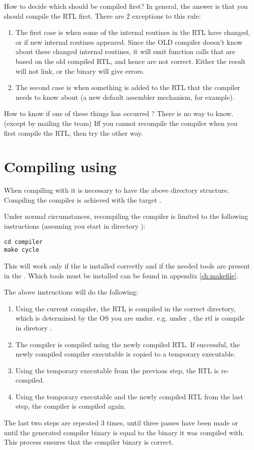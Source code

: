 \documentclass{report}
\begin{document}
How to decide which should be compiled first? In general, the answer is that
you should compile the RTL first. There are 2 exceptions to this rule:
\begin{enumerate}
\item The first case is when some of the internal routines in the RTL 
have changed, or if new internal routines appeared. Since the OLD compiler
doesn't know about these changed internal routines, it will emit function
calls that are based on the old compiled RTL, and hence are not correct.
Either the result will not link, or the binary will give errors.
\item The second case is when something is added to the RTL that the
compiler needs to know about (a new default assembler mechanism, for
example).
\end{enumerate}
How to know if one of these things has occurred ? There is no way to know.
(except by mailing the \fpc team) Iff you cannot recompile the compiler 
when you first compile the RTL, then try the other way.

\section{Compiling using }

When compiling with  it is necessary to have the above directory
structure. Compiling the compiler is achieved with the target .

Under normal circumstances, recompiling the compiler is limited to the
following instructions (assuming you start in directory ):
\begin{verbatim}
cd compiler
make cycle
\end{verbatim}
This will work only if the  is installed correctly and
if the needed tools are present in the . Which tools must be
installed can be found in appendix \ref{ch:makefile}.

The above instructions will do the following:
\begin{enumerate}
\item Using the current compiler, the RTL is compiled in the correct
directory, which is determined by the OS you are under. e.g. under \linux,
the rtl is compile in diretory .
\item The compiler is compiled using the newly compiled RTL. If successful,
the newly compiled compiler executable is copied to a temporary executable.
\item Using the temporary executable from the previous step, the RTL is
re-compiled.
\item Using the temporary executable and the newly compiled RTL from the
last step, the compiler is compiled again.
\end{enumerate}
The last two steps are repeated 3 times, until three passes have been made or
until the generated compiler binary is equal to the binary it was compiled
with. This process ensures that the compiler binary is correct. 
\end{document}
